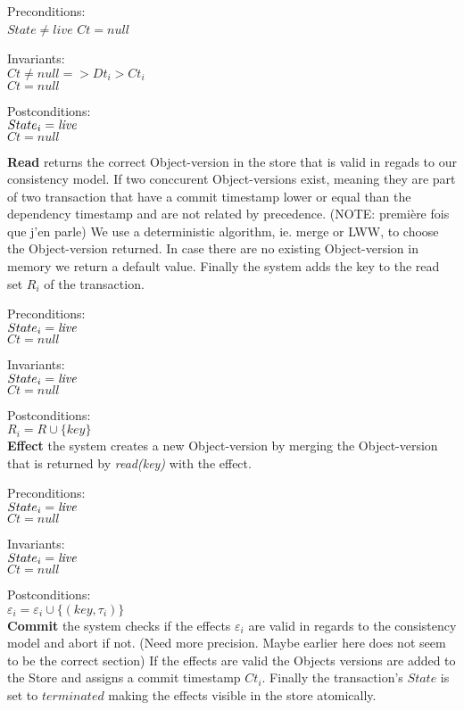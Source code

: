 \documentclass[systeme,french,english]{compas2022}
\begin{document}
Preconditions:\\
$State \neq live$
$Ct = null$

Invariants:\\
\emph{$Ct \neq null => Dt_i > Ct_i$}\\
$Ct = null$

Postconditions:\\
$State_i = \emph{live}$ \\
$Ct = null$


\textbf{Read} returns the correct Object-version in the store that is valid in regads to our consistency model.
If two conccurent Object-versions exist, meaning they are part of two transaction that have a commit timestamp lower or equal than the dependency timestamp and are not related by precedence.
(NOTE: première fois que j'en parle)
We use a deterministic algorithm, ie. merge or LWW, to choose the Object-version returned.
In case there are no existing Object-version in memory we return a default value.
Finally the system adds the key to the read set $R_i$ of the transaction. 

Preconditions:\\ 
$State_i = \emph{live}$ \\
$Ct = null$

Invariants:\\
$State_i = \emph{live}$ \\
$Ct = null$

Postconditions:\\
$R_i = R \cup \{key\}$ \\

\textbf{Effect} the system creates a new Object-version by merging the Object-version that is returned by \emph{read(key)} with the effect.

Preconditions:\\ 
$State_i = \emph{live}$ \\
$Ct = null$

Invariants:\\
$State_i = \emph{live}$ \\
$Ct = null$

Postconditions:\\
$\varepsilon_i = \varepsilon_i \cup \{(key, \tau_i)\}$ \\

\textbf{Commit} the system checks if the effects $\varepsilon_i$ are valid in regards to the consistency model and abort if not. (Need more precision. Maybe earlier here does not seem to be the correct section)
If the effects are valid the Objects versions are added to the Store and assigns a commit timestamp $Ct_i$.
Finally the transaction's $State$ is set to $terminated$ making the effects visible in the store atomically.
\end{document}

